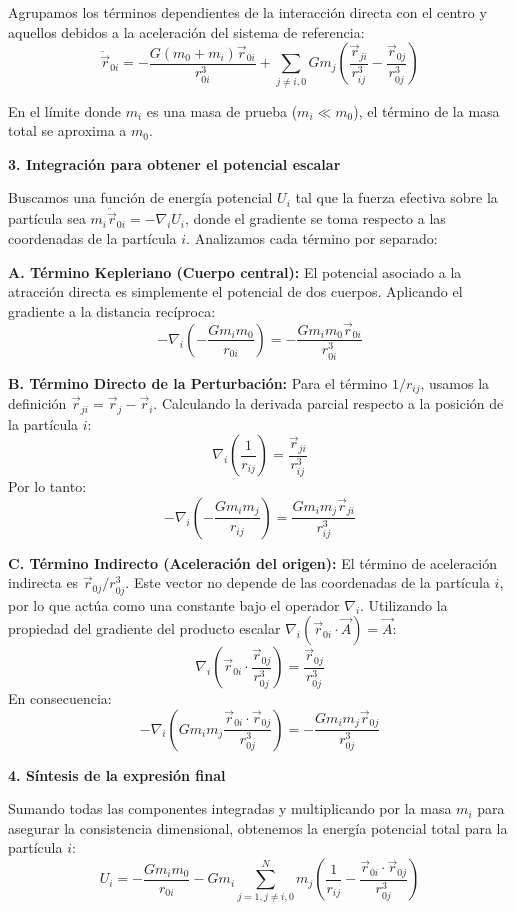 \documentclass[12pt, letterpaper]{article}
\begin{document}
Agrupamos los términos dependientes de la interacción directa con el centro y aquellos debidos a la aceleración del sistema de referencia:
$$ \ddot{\vec{r}}_{0i} = - \frac{G (m_0 + m_i) \vec{r}_{0i}}{r_{0i}^3} + \sum_{j \neq i, 0} G m_j \left( \frac{\vec{r}_{ji}}{r_{ij}^3} - \frac{\vec{r}_{0j}}{r_{0j}^3} \right) $$

En el límite donde $m_i$ es una masa de prueba ($m_i \ll m_0$), el término de la masa total se aproxima a $m_0$.

\textbf{3. Integración para obtener el potencial escalar}

Buscamos una función de energía potencial $U_i$ tal que la fuerza efectiva sobre la partícula sea $m_i \ddot{\vec{r}}_{0i} = - \nabla_i U_i$, donde el gradiente se toma respecto a las coordenadas de la partícula $i$. Analizamos cada término por separado:

\textbf{A. Término Kepleriano (Cuerpo central):}
El potencial asociado a la atracción directa es simplemente el potencial de dos cuerpos. Aplicando el gradiente a la distancia recíproca:
$$ - \nabla_i \left( - \frac{G m_i m_0}{r_{0i}} \right) = - \frac{G m_i m_0 \vec{r}_{0i}}{r_{0i}^3} $$

\textbf{B. Término Directo de la Perturbación:}
Para el término $1/r_{ij}$, usamos la definición $\vec{r}_{ji} = \vec{r}_j - \vec{r}_i$. Calculando la derivada parcial respecto a la posición de la partícula $i$:
$$ \nabla_i \left( \frac{1}{r_{ij}} \right) = \frac{\vec{r}_{ji}}{r_{ij}^3} $$
Por lo tanto:
$$ - \nabla_i \left( - \frac{G m_i m_j}{r_{ij}} \right) = \frac{G m_i m_j \vec{r}_{ji}}{r_{ij}^3} $$

\textbf{C. Término Indirecto (Aceleración del origen):}
El término de aceleración indirecta es $\vec{r}_{0j} / r_{0j}^3$. Este vector no depende de las coordenadas de la partícula $i$, por lo que actúa como una constante bajo el operador $\nabla_i$. Utilizando la propiedad del gradiente del producto escalar $\nabla_i (\vec{r}_{0i} \cdot \vec{A}) = \vec{A}$:
$$ \nabla_i \left( \vec{r}_{0i} \cdot \frac{\vec{r}_{0j}}{r_{0j}^3} \right) = \frac{\vec{r}_{0j}}{r_{0j}^3} $$
En consecuencia:
$$ - \nabla_i \left( G m_i m_j \frac{\vec{r}_{0i} \cdot \vec{r}_{0j}}{r_{0j}^3} \right) = - \frac{G m_i m_j \vec{r}_{0j}}{r_{0j}^3} $$

\textbf{4. Síntesis de la expresión final}

Sumando todas las componentes integradas y multiplicando por la masa $m_i$ para asegurar la consistencia dimensional, obtenemos la energía potencial total para la partícula $i$:
$$ U_i = - \frac{G m_i m_0}{r_{0i}} - G m_i \sum_{j=1, j \neq i, 0}^N m_j \left( \frac{1}{r_{ij}} - \frac{\vec{r}_{0i} \cdot \vec{r}_{0j}}{r_{0j}^3} \right) $$
\end{document}

